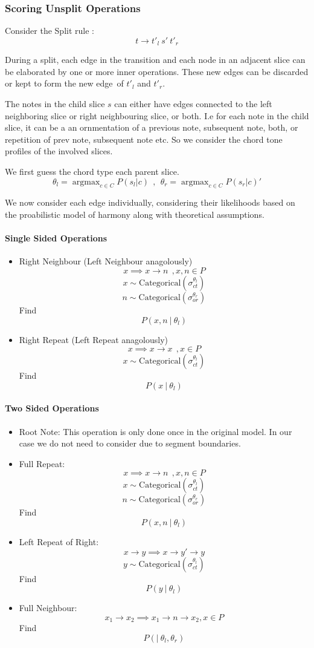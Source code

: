 \documentclass[12pt,a4paper,twoside,openright]{report}
\theoremstyle{definition}
\begin{document}
\FloatBarrier
\subsubsection{Scoring Unsplit Operations}
Consider the Split rule : \[t \to t'_{l}~s'~t'_{r}\]
\par
During a split, each edge in the transition and each node in an adjacent slice can be elaborated by one or more inner operations.
These new edges can be discarded or kept to form the new edge of $t'_l$ and $t'_r$.
\par 
The notes in the child slice $s$ can either have edges connected to the left neighboring slice or right neighbouring slice, or both. I.e for each note in the child slice, it can be a an ornmentation of a previous note, subsequent note, both, or repetition of prev note, subsequent note etc. So we consider the chord tone profiles of the involved slices. 

We first guess the chord type each parent slice. 
\[\theta_l = \mathop{argmax}_{c \in C} P(s_l|c) ~~,~~ \theta_r = \mathop{argmax}_{c \in C} P(s_r|c) '\]

We now consider each edge individually, considering their likelihoods based on the proabilistic model of harmony along with theoretical assumptions. 

\paragraph{Single Sided Operations} 
\begin{itemize}
  \item Right Neighbour (Left Neighbour anagolously)
    \[ x \implies x \to n~~, x,n \in P \]
    \[x \sim \text{Categorical}(\sigma_{ct}^{\theta_l})\]
    \[n \sim \text{Categorical}(\sigma_{or}^{\theta_r})\]
    Find \[P(x,n~|~\theta_l)\]
  \item Right Repeat (Left Repeat anagolously)
    \[ x \implies x \to x~~, x \in P \]
    \[x \sim \text{Categorical}(\sigma_{ct}^{\theta_l})\]
    Find \[P(x~|~\theta_l)\]
\end{itemize}
\paragraph{Two Sided Operations} 
\begin{itemize}
  \item Root Note: This operation is only done once in the original model. In our case we do not need to consider due to segment boundaries.
  \item Full Repeat: 
    \[ x \implies x \to n~~, x,n \in P \]
    \[x \sim \text{Categorical}(\sigma_{ct}^{\theta_l})\]
    \[n \sim \text{Categorical}(\sigma_{or}^{\theta_r})\]
    Find \[P(x,n~|~\theta_l)\]
  \item Left Repeat of Right: 
    \[ x \to y \implies x \to y' \to y \]
    \[y \sim \text{Categorical}(\sigma_{ct}^{\theta_l})\]
    Find \[P(y~|~\theta_l)\]
  \item Full Neighbour:
    \[ x_1 \to x_2 \implies x_1 \to n \to x_2, x \in P \]
    Find \[P(|~\theta_l,\theta_r)\]
\end{itemize}
\end{document}
